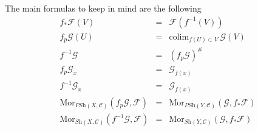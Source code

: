 \medskip\noindent
The main formulas to keep in mind are the following
\begin{eqnarray*}
f_*\mathcal{F}(V) & = & \mathcal{F}(f^{-1}(V)) \\
f_p\mathcal{G}(U) & = & \text{colim}_{f(U) \subset V}\ \mathcal{G}(V) \\
f^{-1}\mathcal{G} & = & (f_p\mathcal{G})^\# \\
f_p\mathcal{G}_x & = & \mathcal{G}_{f(x)} \\
f^{-1}\mathcal{G}_x & = & \mathcal{G}_{f(x)} \\
\text{Mor}_{\textit{PSh}(X, \mathcal{C})}(f_p\mathcal{G}, \mathcal{F})
& = &
\text{Mor}_{\textit{PSh}(Y, \mathcal{C})}(\mathcal{G}, f_*\mathcal{F}) \\
\text{Mor}_{\textit{Sh}(X, \mathcal{C})}(f^{-1}\mathcal{G}, \mathcal{F})
& = &
\text{Mor}_{\textit{Sh}(Y, \mathcal{C})}(\mathcal{G}, f_*\mathcal{F})
\end{eqnarray*}











